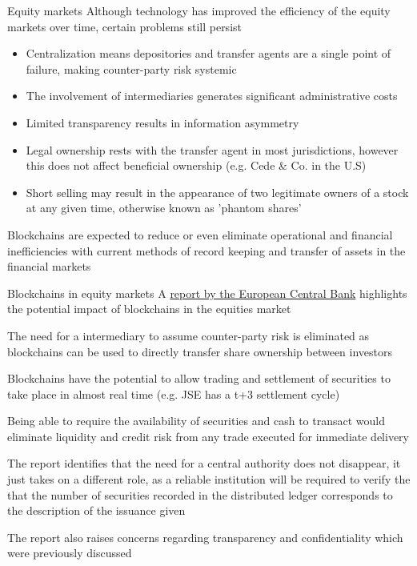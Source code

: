 \documentclass[10pt]{beamer}
\begin{document}
\begin{frame}{Equity markets}
	Although technology has improved the efficiency of the equity markets over time, certain problems still persist
	\begin{itemize}
		\item Centralization means depositories and transfer agents are a single point of failure, making counter-party risk systemic
		\item The involvement of intermediaries generates significant administrative costs
		\item Limited transparency results in information asymmetry
		\item Legal ownership rests with the transfer agent in most jurisdictions, however this does not affect beneficial ownership (e.g. Cede \& Co. in the U.S)
		\item Short selling may result in the appearance of two legitimate owners of a stock at any given time, otherwise known as 'phantom shares'
	\end{itemize}
	Blockchains are expected to reduce or even eliminate operational and financial inefficiencies with current methods of record keeping and transfer of assets in the financial markets
\end{frame}


\begin{frame}{Blockchains in equity markets}
	A \href{https://www.ecb.europa.eu/pub/pdf/scpops/ecbop172.en.pdf}{report by the European Central Bank} highlights the potential impact of blockchains in the equities market
	\begin{itemize}
	\end{itemize}
\end{frame}
\end{document}
